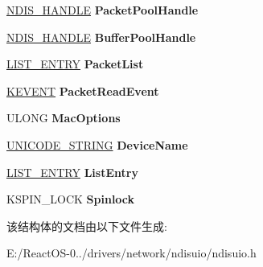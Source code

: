 \begin{DoxyCompactItemize}
\hyperlink{interfacevoid}{N\+D\+I\+S\+\_\+\+H\+A\+N\+D\+LE} {\bfseries Packet\+Pool\+Handle}
\item 
\mbox{\label{struct___n_d_i_s_u_i_o___a_d_a_p_t_e_r___c_o_n_t_e_x_t_aa1a73eb51bc021d1be46ce11f0e38c63}} 
\hyperlink{interfacevoid}{N\+D\+I\+S\+\_\+\+H\+A\+N\+D\+LE} {\bfseries Buffer\+Pool\+Handle}
\item 
\mbox{\label{struct___n_d_i_s_u_i_o___a_d_a_p_t_e_r___c_o_n_t_e_x_t_a5c5461c9ff05b347d5186d8c79874382}} 
\hyperlink{struct___l_i_s_t___e_n_t_r_y}{L\+I\+S\+T\+\_\+\+E\+N\+T\+RY} {\bfseries Packet\+List}
\item 
\mbox{\label{struct___n_d_i_s_u_i_o___a_d_a_p_t_e_r___c_o_n_t_e_x_t_aea6278b2978599f7634771cb1bba33dd}} 
\hyperlink{struct___k_e_v_e_n_t}{K\+E\+V\+E\+NT} {\bfseries Packet\+Read\+Event}
\item 
\mbox{\label{struct___n_d_i_s_u_i_o___a_d_a_p_t_e_r___c_o_n_t_e_x_t_a3049d7f852f13308dc87a31f5cdd4a78}} 
U\+L\+O\+NG {\bfseries Mac\+Options}
\item 
\mbox{\label{struct___n_d_i_s_u_i_o___a_d_a_p_t_e_r___c_o_n_t_e_x_t_ae1fce8b17e57d2078525c56280135728}} 
\hyperlink{struct___u_n_i_c_o_d_e___s_t_r_i_n_g}{U\+N\+I\+C\+O\+D\+E\+\_\+\+S\+T\+R\+I\+NG} {\bfseries Device\+Name}
\item 
\mbox{\label{struct___n_d_i_s_u_i_o___a_d_a_p_t_e_r___c_o_n_t_e_x_t_a995e63f5c3b3efee45a69cb3392ceb04}} 
\hyperlink{struct___l_i_s_t___e_n_t_r_y}{L\+I\+S\+T\+\_\+\+E\+N\+T\+RY} {\bfseries List\+Entry}
\item 
\mbox{\label{struct___n_d_i_s_u_i_o___a_d_a_p_t_e_r___c_o_n_t_e_x_t_a91402987b08e2c1997e84a1c8589471d}} 
K\+S\+P\+I\+N\+\_\+\+L\+O\+CK {\bfseries Spinlock}
\end{DoxyCompactItemize}


该结构体的文档由以下文件生成\+:\begin{DoxyCompactItemize}
\item 
E\+:/\+React\+O\+S-\/0../drivers/network/ndisuio/ndisuio.\+h\end{DoxyCompactItemize}
